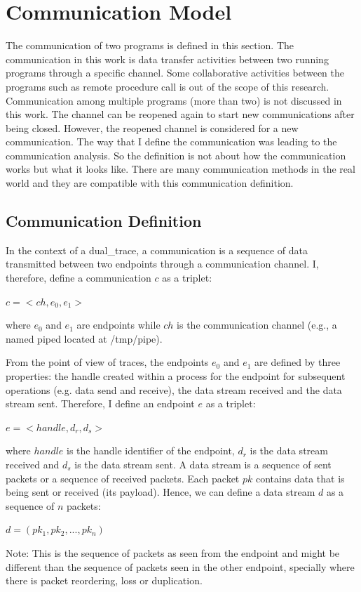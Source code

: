 \section{Communication Model}\label{definition}
The communication of two programs is defined in this section. The communication in this work is data transfer activities between two running programs through a specific channel. Some collaborative activities between the programs such as remote procedure call is out of the scope of this research. Communication among multiple programs (more than two) is not discussed in this work. The channel can be reopened again to start new communications after being closed. However, the reopened channel is considered for a new communication. The way that I define the communication was leading to the communication analysis. So the definition is not about how the communication works but what it looks like. There are many communication methods in the real world and they are compatible with this communication definition. 

\subsection{Communication Definition}
In the context of a dual\_trace, a communication is a sequence of data transmitted between two endpoints through a communication channel. I, therefore, define a communication $c$ as a triplet:

$c =<ch, e_0, e_1>$

where $e_0$ and $e_1$ are endpoints while $ch$ is the communication channel (e.g., a named piped located at /tmp/pipe).

From the point of view of traces, the endpoints $e_0$ and $e_1$ are defined by three properties: the handle created within a process for the endpoint for subsequent operations (e.g. data send and receive), the data stream received and the data stream sent. Therefore, I define an endpoint $e$ as a triplet:

$ e =<handle, d_r, d_s>$

where $handle$ is the handle identifier of the endpoint, $d_r$ is the data stream received and $d_s$ is the data stream sent. A data stream is a sequence of sent packets or a sequence of received packets. Each packet $pk$ contains data that is being sent or received (its payload). Hence, we can define a data stream $d$ as a sequence of $n$ packets:

$ d = (pk_1, pk_2, ..., pk_n)$ 

Note: This is the sequence of packets as seen from the endpoint and might be different than the sequence of packets seen in the other endpoint, specially where there is packet reordering, loss or duplication.

